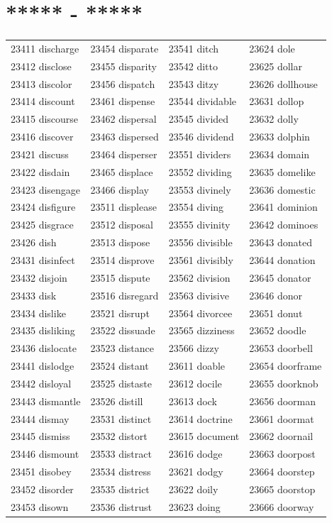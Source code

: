 \documentclass[10pt, oneside]{book}
\begin{document}
\begin{table}
	\centering
	\section*{***** - *****}
	\begin{tabular}{l l l l}
23411 discharge &23454 disparate &23541 ditch &23624 dole\\
23412 disclose &23455 disparity &23542 ditto &23625 dollar\\
23413 discolor &23456 dispatch &23543 ditzy &23626 dollhouse\\
23414 discount &23461 dispense &23544 dividable &23631 dollop\\
23415 discourse &23462 dispersal &23545 divided &23632 dolly\\
23416 discover &23463 dispersed &23546 dividend &23633 dolphin\\
23421 discuss &23464 disperser &23551 dividers &23634 domain\\
23422 disdain &23465 displace &23552 dividing &23635 domelike\\
23423 disengage &23466 display &23553 divinely &23636 domestic\\
23424 disfigure &23511 displease &23554 diving &23641 dominion\\
23425 disgrace &23512 disposal &23555 divinity &23642 dominoes\\
23426 dish &23513 dispose &23556 divisible &23643 donated\\
23431 disinfect &23514 disprove &23561 divisibly &23644 donation\\
23432 disjoin &23515 dispute &23562 division &23645 donator\\
23433 disk &23516 disregard &23563 divisive &23646 donor\\
23434 dislike &23521 disrupt &23564 divorcee &23651 donut\\
23435 disliking &23522 dissuade &23565 dizziness &23652 doodle\\
23436 dislocate &23523 distance &23566 dizzy &23653 doorbell\\
23441 dislodge &23524 distant &23611 doable &23654 doorframe\\
23442 disloyal &23525 distaste &23612 docile &23655 doorknob\\
23443 dismantle &23526 distill &23613 dock &23656 doorman\\
23444 dismay &23531 distinct &23614 doctrine &23661 doormat\\
23445 dismiss &23532 distort &23615 document &23662 doornail\\
23446 dismount &23533 distract &23616 dodge &23663 doorpost\\
23451 disobey &23534 distress &23621 dodgy &23664 doorstep\\
23452 disorder &23535 district &23622 doily &23665 doorstop\\
23453 disown &23536 distrust &23623 doing &23666 doorway\\
	\end{tabular}
 \end{table}
\end{document}
